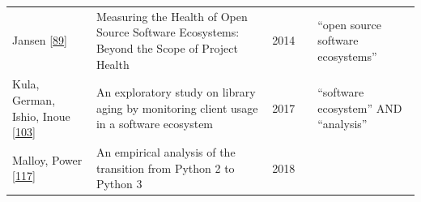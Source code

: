 \documentclass[]{book}
\begin{document}
\begin{longtable}[]{@{}lllll@{}}
\begin{minipage}[t]{0.05\columnwidth}
Jansen {[}\protect\hyperlink{ref-Jansen2014}{89}{]}\strut
\end{minipage} & \begin{minipage}[t]{0.31\columnwidth}\raggedright\strut
Measuring the Health of Open Source Software Ecosystems: Beyond the
Scope of Project Health\strut
\end{minipage} & \begin{minipage}[t]{0.02\columnwidth}\raggedright\strut
2014\strut
\end{minipage} & \begin{minipage}[t]{0.34\columnwidth}\raggedright\strut
\strut
\end{minipage} & \begin{minipage}[t]{0.13\columnwidth}\raggedright\strut
``open source software ecosystems''\strut
\end{minipage}\tabularnewline
\begin{minipage}[t]{0.05\columnwidth}\raggedright\strut
Kula, German, Ishio, Inoue
{[}\protect\hyperlink{ref-Kula2017-2}{103}{]}\strut
\end{minipage} & \begin{minipage}[t]{0.31\columnwidth}\raggedright\strut
An exploratory study on library aging by monitoring client usage in a
software ecosystem\strut
\end{minipage} & \begin{minipage}[t]{0.02\columnwidth}\raggedright\strut
2017\strut
\end{minipage} & \begin{minipage}[t]{0.34\columnwidth}\raggedright\strut
\strut
\end{minipage} & \begin{minipage}[t]{0.13\columnwidth}\raggedright\strut
``software ecosystem'' AND ``analysis''\strut
\end{minipage}\tabularnewline
\begin{minipage}[t]{0.05\columnwidth}\raggedright\strut
Malloy, Power {[}\protect\hyperlink{ref-Malloy2018}{117}{]}\strut
\end{minipage} & \begin{minipage}[t]{0.31\columnwidth}\raggedright\strut
An empirical analysis of the transition from Python 2 to Python 3\strut
\end{minipage} & \begin{minipage}[t]{0.02\columnwidth}\raggedright\strut
2018\strut
\end{minipage} & \begin{minipage}[t]{0.34\columnwidth}\raggedright\strut

\end{minipage}
\end{longtable}
\end{document}
